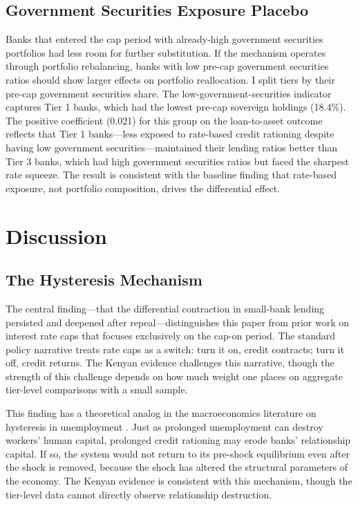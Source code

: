 \documentclass[12pt]{article}
\begin{document}


\subsection{Government Securities Exposure Placebo}

Banks that entered the cap period with already-high government securities portfolios had less room for further substitution. If the mechanism operates through portfolio rebalancing, banks with low pre-cap government securities ratios should show larger effects on portfolio reallocation. I split tiers by their pre-cap government securities share. The low-government-securities indicator captures Tier 1 banks, which had the lowest pre-cap sovereign holdings (18.4\%). The positive coefficient (0.021) for this group on the loan-to-asset outcome reflects that Tier 1 banks---less exposed to rate-based credit rationing despite having low government securities---maintained their lending ratios better than Tier 3 banks, which had high government securities ratios but faced the sharpest rate squeeze. The result is consistent with the baseline finding that rate-based exposure, not portfolio composition, drives the differential effect.


\section{Discussion}
\label{sec:discussion}

\subsection{The Hysteresis Mechanism}

The central finding---that the differential contraction in small-bank lending persisted and deepened after repeal---distinguishes this paper from prior work on interest rate caps that focuses exclusively on the cap-on period. The standard policy narrative treats rate caps as a switch: turn it on, credit contracts; turn it off, credit returns. The Kenyan evidence challenges this narrative, though the strength of this challenge depends on how much weight one places on aggregate tier-level comparisons with a small sample.

This finding has a theoretical analog in the macroeconomics literature on hysteresis in unemployment \citep{blanchard1986hysteresis}. Just as prolonged unemployment can destroy workers' human capital, prolonged credit rationing may erode banks' relationship capital. If so, the system would not return to its pre-shock equilibrium even after the shock is removed, because the shock has altered the structural parameters of the economy. The Kenyan evidence is consistent with this mechanism, though the tier-level data cannot directly observe relationship destruction.
\end{document}
